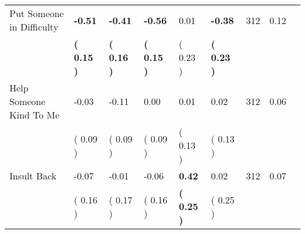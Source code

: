 \begin{tabular}{L{6.2cm} C{1.8cm} C{1.8cm} C{1.8cm} C{1.8cm} C{1.8cm} C{1.8cm} C{0.3cm} C{0.3cm}}
Put Someone in Difficulty & \textbf{    -0.51} & \textbf{    -0.41} & \textbf{    -0.56} &      0.01 & \textbf{    -0.38}  & 312 &       0.12 \\ 
 & \textbf{(     0.15 )} & \textbf{(     0.16 )} & \textbf{(     0.15 )} & (     0.23 ) & \textbf{(     0.23 )}  & \\
Help Someone Kind To Me &     -0.03 &     -0.11 &      0.00 &      0.01 &      0.02  & 312 &       0.06 \\ 
 & (     0.09 ) & (     0.09 ) & (     0.09 ) & (     0.13 ) & (     0.13 )  & \\
Insult Back &     -0.07 &     -0.01 &     -0.06 & \textbf{     0.42} &      0.02  & 312 &       0.07 \\ 
 & (     0.16 ) & (     0.17 ) & (     0.16 ) & \textbf{(     0.25 )} & (     0.25 )  & \\
\bottomrule
\end{tabular}
